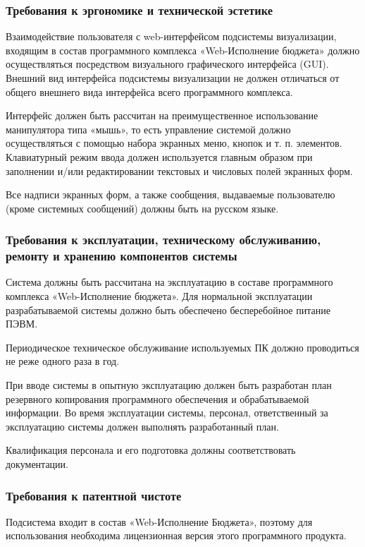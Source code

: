 \documentclass[a4paper]{extarticle}
\begin{document}
\subsubsection{Требования к эргономике и технической эстетике}
Взаимодействие пользователя с web-интерфейсом подсистемы визуализации, входящим в состав программного комплекса «Web-Исполнение бюджета» должно осуществляться посредством визуального графического интерфейса (GUI). Внешний вид интерфейса подсистемы визуализации не должен отличаться от общего внешнего вида интерфейса всего программного комплекса.\par
Интерфейс должен быть рассчитан на преимущественное использование манипулятора типа «мышь», то есть управление системой должно осуществляться с помощью набора экранных меню, кнопок и т. п. элементов. Клавиатурный режим ввода должен используется главным образом при заполнении и/или редактировании текстовых и числовых полей экранных форм.\par
Все надписи экранных форм, а также сообщения, выдаваемые пользователю (кроме системных сообщений) должны быть на русском языке.

\subsubsection{Требования к эксплуатации, техническому обслуживанию, ремонту и хранению компонентов системы}
Система должны быть рассчитана на эксплуатацию в составе программного комплекса «Web-Исполнение бюджета». Для нормальной эксплуатации разрабатываемой системы должно быть обеспечено бесперебойное питание ПЭВМ.\par
Периодическое техническое обслуживание используемых ПК должно проводиться не реже одного раза в год.\par
При вводе системы в опытную эксплуатацию должен быть разработан план резервного копирования программного обеспечения и обрабатываемой информации. Во время эксплуатации системы, персонал, ответственный за эксплуатацию системы должен выполнять разработанный план.\par
Квалификация персонала и его подготовка должны соответствовать документации.

\subsubsection{Требования к патентной чистоте}
Подсистема входит в состав «Web-Исполнение Бюджета», поэтому для использования необходима лицензионная версия этого программного продукта.
\end{document}
